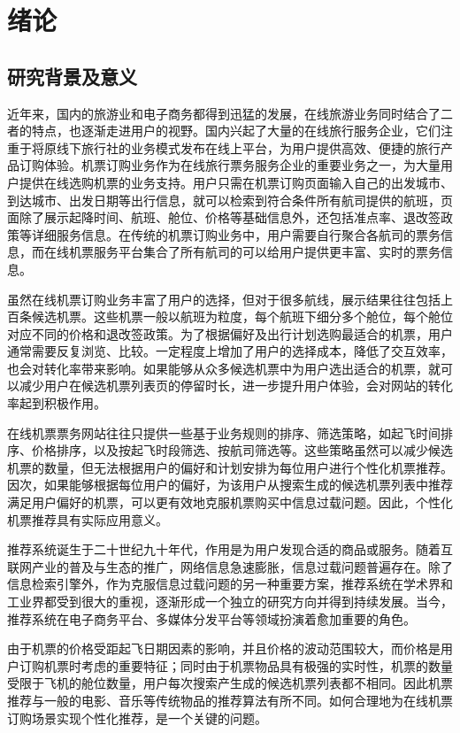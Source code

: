
\chapter{绪论 }
\label{chap:intro}


\section{研究背景及意义}
近年来，国内的旅游业和电子商务都得到迅猛的发展，在线旅游业务同时结合了二者的特点，也逐渐走进用户的视野。国内兴起了大量的在线旅行服务企业，它们注重于将原线下旅行社的业务模式发布在线上平台，为用户提供高效、便捷的旅行产品订购体验。机票订购业务作为在线旅行票务服务企业的重要业务之一，为大量用户提供在线选购机票的业务支持。用户只需在机票订购页面输入自己的出发城市、到达城市、出发日期等出行信息，就可以检索到符合条件所有航司提供的航班，页面除了展示起降时间、航班、舱位、价格等基础信息外，还包括准点率、退改签政策等详细服务信息。在传统的机票订购业务中，用户需要自行聚合各航司的票务信息，而在线机票服务平台集合了所有航司的可以给用户提供更丰富、实时的票务信息。

虽然在线机票订购业务丰富了用户的选择，但对于很多航线，展示结果往往包括上百条候选机票。这些机票一般以航班为粒度，每个航班下细分多个舱位，每个舱位对应不同的价格和退改签政策。为了根据偏好及出行计划选购最适合的机票，用户通常需要反复浏览、比较。一定程度上增加了用户的选择成本，降低了交互效率，也会对转化率带来影响。如果能够从众多候选机票中为用户选出适合的机票，就可以减少用户在候选机票列表页的停留时长，进一步提升用户体验，会对网站的转化率起到积极作用。

在线机票票务网站往往只提供一些基于业务规则的排序、筛选策略，如起飞时间排序、价格排序，以及按起飞时段筛选、按航司筛选等。这些策略虽然可以减少候选机票的数量，但无法根据用户的偏好和计划安排为每位用户进行个性化机票推荐。因次，如果能够根据每位用户的偏好，为该用户从搜索生成的候选机票列表中推荐满足用户偏好的机票，可以更有效地克服机票购买中信息过载问题。因此，个性化机票推荐具有实际应用意义。

推荐系统诞生于二十世纪九十年代，作用是为用户发现合适的商品或服务。随着互联网产业的普及与生态的推广，网络信息急速膨胀，信息过载问题普遍存在。除了信息检索引擎外，作为克服信息过载问题的另一种重要方案，推荐系统在学术界和工业界都受到很大的重视，逐渐形成一个独立的研究方向并得到持续发展。当今，推荐系统在电子商务平台、多媒体分发平台等领域扮演着愈加重要的角色。

由于机票的价格受距起飞日期因素的影响，并且价格的波动范围较大，而价格是用户订购机票时考虑的重要特征；同时由于机票物品具有极强的实时性，机票的数量受限于飞机的舱位数量，用户每次搜索产生成的候选机票列表都不相同。因此机票推荐与一般的电影、音乐等传统物品的推荐算法有所不同。如何合理地为在线机票订购场景实现个性化推荐，是一个关键的问题。

